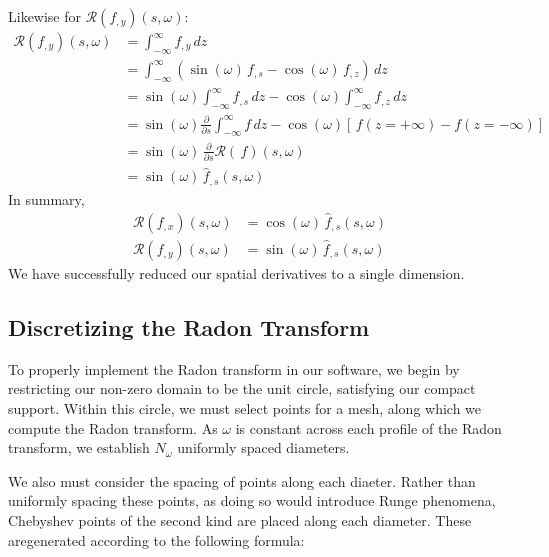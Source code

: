 Likewise for $\mathcal{R} \left( f_{,y} \right) \left( s, \omega \right)$:
\begin{align*}
    \mathcal{R} \left( f_{,y} \right) \left( s, \omega \right) & = \int_{-\infty}^{\infty} f_{, y} \, dz  \\
    & = \int_{-\infty}^{\infty}  \left( \sin (\omega) \, f_{, s} - \cos (\omega) \, f_{, z} \right) \, dz \\
    & = \sin (\omega) \int_{-\infty}^{\infty} f_{, s} \, dz - \cos (\omega) \int_{-\infty}^{\infty} f_{, z} \, dz \\
    & = \sin (\omega) \frac{\partial}{\partial s} \int_{-\infty}^{\infty} f\,dz - \cos (\omega) \left[\, f(z = +\infty) - f(z = -\infty) \right] \\
    & = \sin (\omega) \, \frac{\partial}{\partial s} \mathcal{R}(\,f) \left( s, \omega \right) \\
    & = \sin (\omega) \, \widehat{f}_{,s} \left( s, \omega \right)
\end{align*}
In summary,
\begin{align*}
    \mathcal{R} \left( f_{,x} \right) \left( s, \omega \right) & = \cos (\omega) \, \widehat{f}_{,s} \left( s, \omega \right) \\
    \mathcal{R} \left( f_{,y} \right) \left( s, \omega \right) & = \sin (\omega) \, \widehat{f}_{,s} \left( s, \omega \right)
\end{align*}
We have successfully reduced our spatial derivatives to a single dimension.

\subsection{Discretizing the Radon Transform}

To properly implement the Radon transform in our software, we begin by restricting our non-zero domain to be the unit circle, satisfying our compact support.
Within this circle, we must select points for a mesh, along which we compute the Radon transform.
As $\omega$ is constant across each profile of the Radon transform, we establish $N_\omega$ uniformly spaced diameters.

We also must consider the spacing of points along each diaeter.
Rather than uniformly spacing these points, as doing so would introduce Runge phenomena, Chebyshev points of the second kind are placed along each diameter.
These aregenerated according to the following formula:

